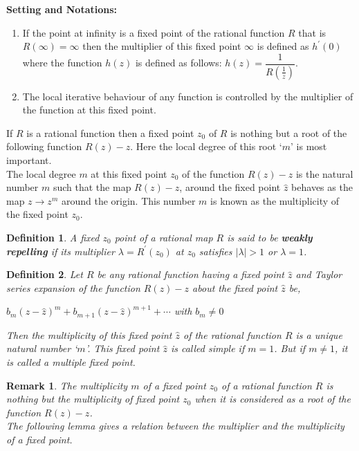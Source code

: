 \documentclass[a4paper,12pt,reqno]{amsart}
\newtheorem{definition}{Definition}
\newtheorem*{remark}{Remark}
\begin{document}
 \textbf{Setting and Notations:}
\begin{enumerate}
\item[•] If the point at infinity is a fixed point of the rational function $R$ that is  $R(\infty)=\infty$ then the multiplier of this fixed point $\infty$ is defined as $h^\prime(0)$ where the function $h(z)$ is defined as follows: $h(z)=\dfrac{1}{R\left( \frac{1}{z}\right)}$.
\item[•] The local iterative behaviour of any function is controlled by the  multiplier of the function at this fixed point.
\end{enumerate}

If $R$ is a rational function then a fixed point $z_{0}$ of $R$ is nothing but a root of the following function $R(z)-z$. Here the local degree of this root `$m$' is most important. \\
 	The local degree $m$ at this fixed point $z_{0}$ of the function $R(z)-z$ is the natural number $m$ such that the map $R(z)-z$, around the fixed point $\hat{z}$ behaves as the map $z\rightarrow z^{m}$ around the origin. This number $m$ is known as the multiplicity of the fixed point $z_{0}$.
 	 
 	\begin{definition}\label{D1}\cite{The real non-attractive fixed point conjecture and beyond} A fixed $z_{0}$ point of a rational map 
 	$R$ is said to be \textbf{weakly repelling} if its multiplier $\lambda=R^{\prime}(z_{0})$ at $z_{0}$ satisfies $\mid\lambda\mid>1$ or $\lambda=1$.
  \end{definition}
 	 
      
 	\begin{definition}\label{D1}\label{def:mul}\cite{The real non-attractive fixed point conjecture and beyond} Let $R$ be any rational function having a fixed point $\hat{z}$ and Taylor series expansion of the function $R(z)-z$ about the fixed point $\hat{z}$ be,
 	\begin{center}	 $b_{m}(z-\hat{z})^{m}+b_{m+1}(z-\hat{z})^{m+1}+\cdots$ with $b_{m}\neq 0$
 	\end{center}
 	Then the multiplicity of this fixed point $\hat{z}$ of  the rational function $R$ is a unique natural number `$m$'. This fixed point $\hat{z}$ is called  simple if $m=1$. But if $m\neq 1$, it is called a multiple fixed point.
    \end{definition}
 	
 	\begin{remark}
 	    
 	 The multiplicity $m$ of a fixed point $z_{0}$ of a rational function $R$ is nothing but the multiplicity of fixed point $z_{0}$ when it is considered as a root of the function $R(z)-z$.\\
 	The following lemma gives a relation between the multiplier and the multiplicity of a fixed point.
\end{remark}
 
\end{document}
